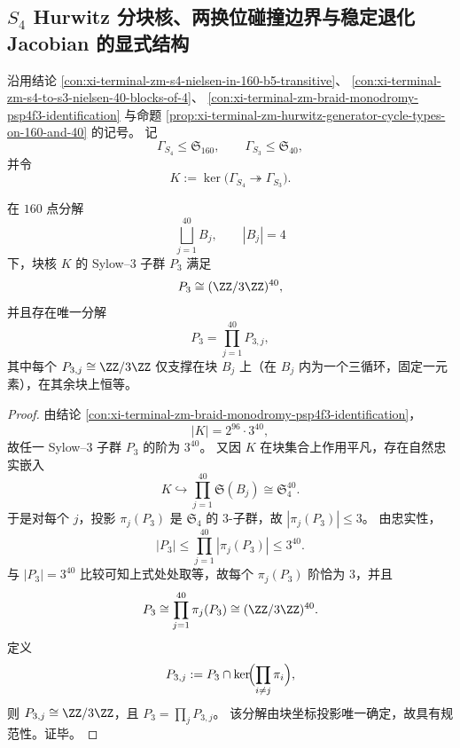 \subsection{\texorpdfstring{$S_4$}{S4} Hurwitz 分块核、两换位碰撞边界与稳定退化 Jacobian 的显式结构}\label{subsec:conclusion-s4-hurwitz-block-kernel-boundary-cusp-stable-jacobian}
沿用结论 \ref{con:xi-terminal-zm-s4-nielsen-in-160-b5-transitive}、
\ref{con:xi-terminal-zm-s4-to-s3-nielsen-40-blocks-of-4}、
\ref{con:xi-terminal-zm-braid-monodromy-psp4f3-identification} 与命题
\ref{prop:xi-terminal-zm-hurwitz-generator-cycle-types-on-160-and-40} 的记号。
记
\[
\Gamma_{S_4}\leq \mathfrak S_{160},\qquad
\Gamma_{S_3}\leq \mathfrak S_{40},
\]
并令
\[
K:=\ker\!\bigl(\Gamma_{S_4}\twoheadrightarrow \Gamma_{S_3}\bigr).
\]

\begin{theorem}\label{thm:conclusion-s4-block-kernel-sylow3-canonical-splitting}
在 \(160\) 点分解
\[
\bigsqcup_{j=1}^{40}B_j,\qquad |B_j|=4
\]
下，块核 \(K\) 的 Sylow--\(3\) 子群 \(P_3\) 满足
\[
P_3\cong (\ZZ/3\ZZ)^{40},
\]
并且存在唯一分解
\[
P_3=\prod_{j=1}^{40}P_{3,j},
\]
其中每个 \(P_{3,j}\cong \ZZ/3\ZZ\) 仅支撑在块 \(B_j\) 上（在 \(B_j\) 内为一个三循环，固定一元素），在其余块上恒等。
\end{theorem}
\begin{proof}
由结论 \ref{con:xi-terminal-zm-braid-monodromy-psp4f3-identification}，
\[
|K|=2^{96}\cdot 3^{40},
\]
故任一 Sylow--\(3\) 子群 \(P_3\) 的阶为 \(3^{40}\)。
又因 \(K\) 在块集合上作用平凡，存在自然忠实嵌入
\[
K\hookrightarrow \prod_{j=1}^{40}\mathfrak S(B_j)\cong \mathfrak S_4^{40}.
\]
于是对每个 \(j\)，投影 \(\pi_j(P_3)\) 是 \(\mathfrak S_4\) 的 \(3\)-子群，故
\(
|\pi_j(P_3)|\le 3
\)。
由忠实性，
\[
|P_3|
\le \prod_{j=1}^{40}|\pi_j(P_3)|
\le 3^{40}.
\]
与 \(|P_3|=3^{40}\) 比较可知上式处处取等，故每个 \(\pi_j(P_3)\) 阶恰为 \(3\)，并且
\[
P_3\cong \prod_{j=1}^{40}\pi_j(P_3)\cong (\ZZ/3\ZZ)^{40}.
\]
定义
\[
P_{3,j}:=P_3\cap \ker\!\Bigl(\prod_{i\neq j}\pi_i\Bigr),
\]
则 \(P_{3,j}\cong \ZZ/3\ZZ\)，且 \(P_3=\prod_j P_{3,j}\)。
该分解由块坐标投影唯一确定，故具有规范性。证毕。
\end{proof}

